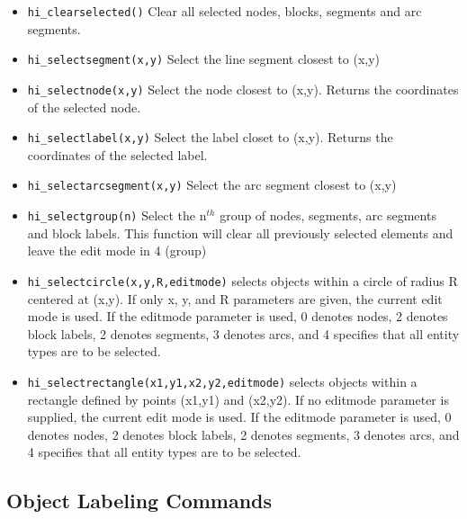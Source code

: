 \begin{itemize}
\item {\tt hi\_clearselected()} Clear all selected nodes, blocks, segments and arc
segments.

\item {\tt hi\_selectsegment(x,y)} Select the line segment closest to (x,y)

\item {\tt hi\_selectnode(x,y)} Select the node closest to (x,y).
Returns the coordinates of the selected node.

\item {\tt hi\_selectlabel(x,y)} Select the label closet to (x,y).
Returns the coordinates of the selected label.

\item {\tt hi\_selectarcsegment(x,y)} Select the arc segment closest to (x,y)

\item {\tt hi\_selectgroup(n)} Select the n$^{th}$ group of nodes, segments, arc
segments and block labels. This function will clear all previously selected
elements and leave the edit mode in 4 (group)

\item{\tt hi\_selectcircle(x,y,R,editmode)} selects objects within a circle of radius
R centered at (x,y).  If only x, y, and R parameters are given, the current
edit mode is used.  If the editmode parameter is used, 0 denotes nodes, 2
denotes block labels, 2 denotes segments, 3 denotes arcs, and 4 specifies
that all entity types are to be selected.

\item{\tt hi\_selectrectangle(x1,y1,x2,y2,editmode)} selects objects within a rectangle
defined by points (x1,y1) and (x2,y2). If no editmode parameter is supplied,
the current edit mode is used.  If the editmode parameter is used, 0 denotes
nodes, 2 denotes block labels, 2 denotes segments, 3 denotes arcs, and 4 
specifies that all entity types are to be selected.
\end{itemize}


\subsection{Object Labeling Commands}

